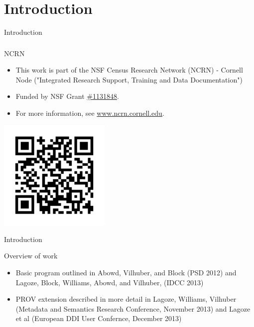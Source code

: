 \section{Introduction}
\begin{frame}{Introduction}
\frametitle{}
\begin{block}{NCRN}
\begin{itemize}
\item This work is part of the NSF Census Research Network (NCRN) - Cornell Node ("Integrated Research Support, Training and Data Documentation")
\item Funded by NSF Grant \href{http://www.nsf.gov/awardsearch/showAward.do?AwardNumber=1131848}{\#1131848}. 
\item For more information, see \href{http://www.ncrn.cornell.edu}{www.ncrn.cornell.edu}.
\end{itemize}
\begin{center}
\href{http://www.ncrn.cornell.edu}{\includegraphics[width=0.4\textwidth]{qr-ncrn.png}}
\end{center}
\end{block}
\end{frame}

\begin{frame}{Introduction}
\begin{block}{Overview of work}
\begin{itemize}
\item Basic program outlined in Abowd, Vilhuber, and Block (PSD 2012) 
\cite{AbowdVilhuberBlock2012} 
and Lagoze, Block, Williams, Abowd, and Vilhuber, (IDCC 2013) 
\cite{DBLP:journals/ijdc/LagozeBWAV13}
\item PROV extension described in more detail in Lagoze, Williams, Vilhuber (Metadata and 
Semantics Research Conference, November 2013) and Lagoze et al (European DDI User 
Confernce, December 2013) \cite{LagozeEtAl2013}
\end{itemize}
\end{block}
\end{frame}

